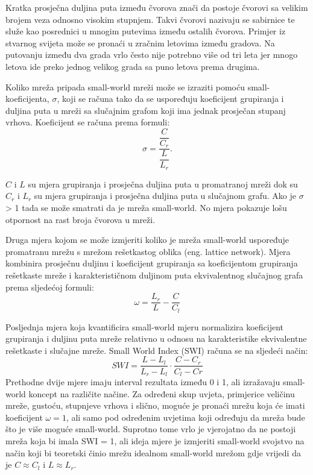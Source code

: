 Kratka prosječna duljina puta između čvorova znači da postoje čvorovi sa velikim brojem veza odnosno visokim stupnjem. Takvi čvorovi nazivaju se sabirnice te služe kao posrednici u mnogim putevima između ostalih čvorova. Primjer iz stvarnog svijeta može se pronaći u zračnim letovima između gradova. Na putovanju između dva grada vrlo često nije potrebno više od tri leta jer mnogo letova ide preko jednog velikog grada sa puno letova prema drugima. 

Koliko mreža pripada small-world mreži može se izraziti pomoću small-koeficijenta, \textit{$\sigma$}, koji se računa tako da se uspoređuju koeficijent grupiranja i duljina puta u mreži sa slučajnim grafom koji ima jednak prosječan stupanj vrhova. Koeficijent se računa prema formuli:
\begin{equation}
 \sigma = \dfrac{\dfrac{C}{C_{r}}}{\dfrac{L}{L_{r}}}.
\end{equation}

$ C $ i $ L $ su mjera grupiranja i prosječna duljina puta u promatranoj mreži dok su  $ C_{r} $ i $ L_{r} $ su mjera grupiranja i prosječna duljina puta u slučajnom grafu. Ako je $ \sigma $ > 1 tada se može smatrati da je mreža small-world. No mjera pokazuje lošu otpornost na rast broja čvorova u mreži.

Druga mjera kojom se može izmjeriti koliko je mreža small-world uspoređuje promatranu mrežu s mrežom rešetkastog oblika (eng. lattice network). Mjera kombinira prosječnu duljinu i koeficijent grupiranja sa koeficijentom grupiranja rešetkaste mreže i karakterističnom duljinom puta ekvivalentnog slučajnog grafa prema sljedećoj formuli:
\begin{equation}
	\omega = \dfrac{L_{r}}{L} - \dfrac{C}{C_{l}}
\end{equation}

Posljednja mjera koja kvantificira small-world mjeru normalizira koeficijent grupiranja i duljinu puta mreže relativno u odnosu na karakteristike ekvivalentne rešetkaste i slučajne mreže. Small World Index (SWI) računa se na sljedeći način:
\begin{equation}
	SWI = \dfrac{L - L_{l}}{L_{r} - L_{l}} \cdot \dfrac{C - C_{r}}{C_{l} - C{r}}
\end{equation} 
Prethodne dvije mjere imaju interval rezultata između 0 i 1, ali izražavaju small-world koncept na različite načine. Za određeni skup uvjeta, primjerice veličinu mreže, gustoću, stupnjeve vrhova i slično, moguće je pronaći mrežu koja će imati koeficijent $ \omega = 1 $, ali samo pod određenim uvjetima koji određuju da mreža bude što je više moguće small-world. Suprotno tome vrlo je vjerojatno da ne postoji mreža koja bi imala SWI = 1, ali ideja mjere je izmjeriti small-world svojstvo na način koji bi teoretski činio mrežu idealnom small-world mrežom gdje vrijedi da je $ C \approx C_{l} $ i $ L \approx L_{r} $.

